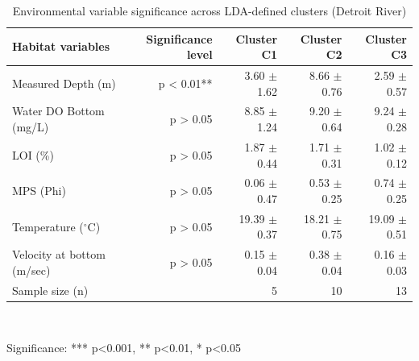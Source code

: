 \begin{table}[htbp]
  \centering
  \caption{Environmental variable significance across LDA-defined clusters (Detroit River)}
  \label{tab:dr_03_LDA_Classification_lda_env_significance}
  \begin{tabular}{lrrrr}
    \toprule
    Habitat variables & Significance level & Cluster C1 & Cluster C2 & Cluster C3 \\
    \midrule
    Measured Depth (m) & p < 0.01** & 3.60 $\pm$ 1.62 & 8.66 $\pm$ 0.76 & 2.59 $\pm$ 0.57 \\
    Water DO Bottom (mg/L) & p > 0.05 & 8.85 $\pm$ 1.24 & 9.20 $\pm$ 0.64 & 9.24 $\pm$ 0.28 \\
    LOI (\%) & p > 0.05 & 1.87 $\pm$ 0.44 & 1.71 $\pm$ 0.31 & 1.02 $\pm$ 0.12 \\
    MPS (Phi) & p > 0.05 & 0.06 $\pm$ 0.47 & 0.53 $\pm$ 0.25 & 0.74 $\pm$ 0.25 \\
    Temperature ($^{\circ}$C) & p > 0.05 & 19.39 $\pm$ 0.37 & 18.21 $\pm$ 0.75 & 19.09 $\pm$ 0.51 \\
    Velocity  at bottom (m/sec) & p > 0.05 & 0.15 $\pm$ 0.04 & 0.38 $\pm$ 0.04 & 0.16 $\pm$ 0.03 \\
    Sample size (n) &  & 5 & 10 & 13 \\
    \bottomrule
  \end{tabular}
  \\[4pt]
  \parbox{\textwidth}{\footnotesize Significance: *** p<0.001, ** p<0.01, * p<0.05}
\end{table}
